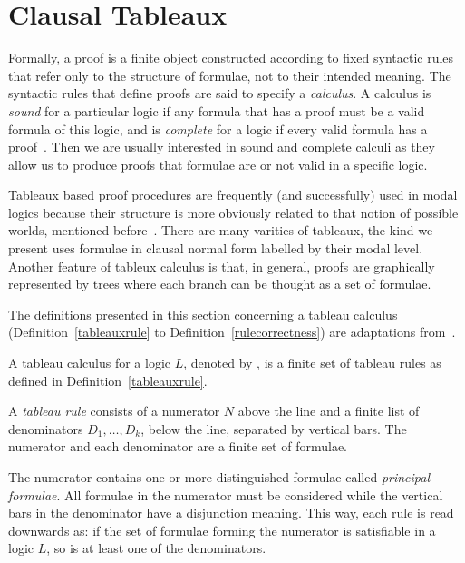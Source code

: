 \section{Clausal Tableaux}
\label{sec:tableauxclausal}

Formally, a proof is a finite object constructed according to fixed syntactic
rules that refer only to the structure of formulae, not to their intended
meaning. The syntactic rules that define proofs are said to specify a
\emph{calculus}. A calculus is \emph{sound} for a particular logic if any
formula that has a proof must be a valid formula of this logic, and is
\emph{complete} for a logic if every valid formula has a proof~\cite{fitting}.
Then we are usually interested in sound and complete calculi as they allow us
to produce proofs that formulae are or not valid in a specific logic.

Tableaux based proof procedures are frequently (and successfully) used in modal
logics because their structure is more obviously related to that notion of
possible worlds, mentioned before~\cite{fitting}. There are many varities of
tableaux, the kind we present uses formulae in clausal normal form labelled by
their modal level. Another feature of tableux calculus is that, in general,
proofs are graphically represented by trees where each branch can be thought as
a set of formulae.

The definitions presented in this section concerning a tableau calculus
(Definition~\ref{tableauxrule} to Definition~\ref{rulecorrectness}) are
adaptations from~\cite{gore2009clausal}.

A tableau calculus for a logic $L$, denoted by , is a finite set of
tableau rules as defined in Definition~\ref{tableauxrule}.

\begin{definition}
\label{tableauxrule}
    A \emph{tableau rule \trule} consists of a numerator $N$ above the line and
    a finite list of denominators $D_1, \ldots, D_k$, below the line, separated
    by vertical bars. The numerator and each denominator are a finite set of
    formulae.
\end{definition}

The numerator contains one or more distinguished formulae called \emph{principal
formulae}. All formulae in the numerator must be considered while the vertical
bars in the denominator have a disjunction meaning. This way, each rule is read
downwards as: if the set of formulae forming the numerator is satisfiable in a
logic $L$, so is at least one of the denominators.

